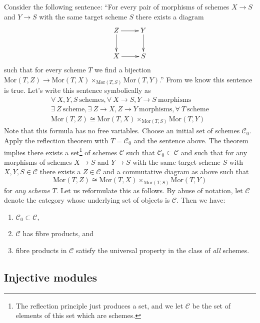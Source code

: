 \noindent
Consider the following sentence: ``For every pair of morphisms of
schemes $X \to S$ and $Y\to S$ with the same target scheme $S$
there exists a diagram
$$
\xymatrix{
Z \ar[r] \ar[d] & Y \ar[d] \cr
X \ar[r] & S \cr
}
$$
such that for every scheme $T$ we 
find a bijection $\text{Mor}(T, Z) \to \text{Mor}(T,X)
\times_{\text{Mor}(T,S)} \text{Mor}(T, Y)$.''
From \cite{H} we know this sentence is true.
Let's write this sentence symbolically as
\begin{eqnarray*}
\forall\ X,Y,S\ \text{schemes},
\forall\ X\to S, Y\to S\ \text{morphisms} \\
\exists\ Z\ \text{scheme},
\exists\ Z \to X, Z\to Y\ \text{morphisms},
\forall\ T\ \text{scheme} \\
\text{Mor}(T, Z) \cong \text{Mor}(T,X)
\times_{\text{Mor}(T,S)} \text{Mor}(T, Y)
\end{eqnarray*}
Note that this formula has no free variables.
Choose an initial set of schemes $\mathcal{C}_0$.
Apply the reflection theorem with $T=\mathcal{C}_0$
and the sentence above. The theorem implies
there exists a set\footnote{The
reflection principle just produces a set, and we
let $\mathcal{C}$ be the set of elements of this set which are schemes.}
of schemes
$\mathcal{C}$ such that
$\mathcal{C}_0 \subset \mathcal{C}$ and such that
for any morphisms of schemes $X \to S$ and $Y\to S$
with the same target scheme $S$ with $X,Y,S \in \mathcal{C}$
there exists a $Z \in \mathcal{C}$ and a commutative
diagram as above such that
$$
\text{Mor}(T, Z) \cong \text{Mor}(T,X)
\times_{\text{Mor}(T,S)} \text{Mor}(T, Y)
$$
for {\it any scheme} $T$. Let us reformulate this as follows.
By abuse of notation, let $\mathcal{C}$ denote the category
whose underlying set of objects is $\mathcal{C}$.
Then we have:
\begin{enumerate}
\item $\mathcal{C}_0 \subset \mathcal{C}$,
\item $\mathcal{C}$ has fibre products, and
\item fibre products in $\mathcal{C}$ satisfy
the universal property in the class of {\it all} schemes.
\end{enumerate}

\subsection{Injective modules}

